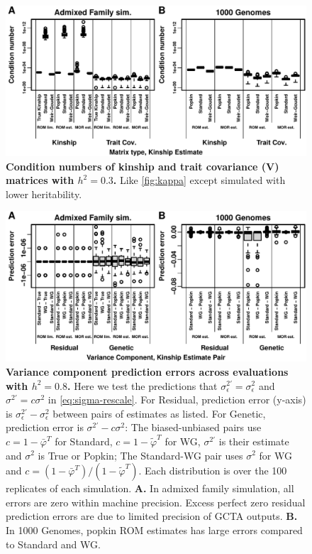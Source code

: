 \documentclass[11pt]{article}
\begin{document}
\begin{figure}[bp!]
  \centering
  \includegraphics[width=\textwidth]{h-0.3/kappa.pdf}
  \caption{
    {\bf Condition numbers of kinship and trait covariance ($\mathbf{V}$) matrices with $h^2=0.3$.}
    Like \cref{fig:kappa} except simulated with lower heritability.
  }
  \label{fig:kappa-h3}
\end{figure}

\begin{figure}[bp!]
  \centering
  \includegraphics[width=\textwidth]{preds-reml-errors.pdf}
  \caption{
    {\bf Variance component prediction errors across evaluations with $h^2=0.8$.}
    Here we test the predictions that $\sigma^{2\prime}_\epsilon = \sigma^2_\epsilon$ and $\sigma^{2\prime} = c \sigma^2$ in \cref{eq:sigma-rescale}.
    For Residual, prediction error (y-axis) is $\sigma^{2\prime}_\epsilon - \sigma^2_\epsilon$ between pairs of estimates as listed.
    For Genetic, prediction error is $\sigma^{2\prime} - c \sigma^2$:
    The biased-unbiased pairs use $c = 1 - \bar{\varphi}^T$ for Standard, $c = 1 - \tilde{\varphi}^T$ for WG, $\sigma^{2\prime}$ is their estimate and $\sigma^2$ is True or Popkin;
    The Standard-WG pair uses $\sigma^2$ for WG and $c = \left( 1 - \bar{\varphi}^T \right) / \left( 1 - \tilde{\varphi}^T \right)$.
    Each distribution is over the 100 replicates of each simulation.
    \textbf{A.}
    In admixed family simulation, all errors are zero within machine precision.
    Excess perfect zero residual prediction errors are due to limited precision of GCTA outputs.
    \textbf{B.}
    In 1000 Genomes, popkin ROM estimates has large errors compared to Standard and WG.
  }
  \label{fig:preds-reml-errors}
\end{figure}
\end{document}
